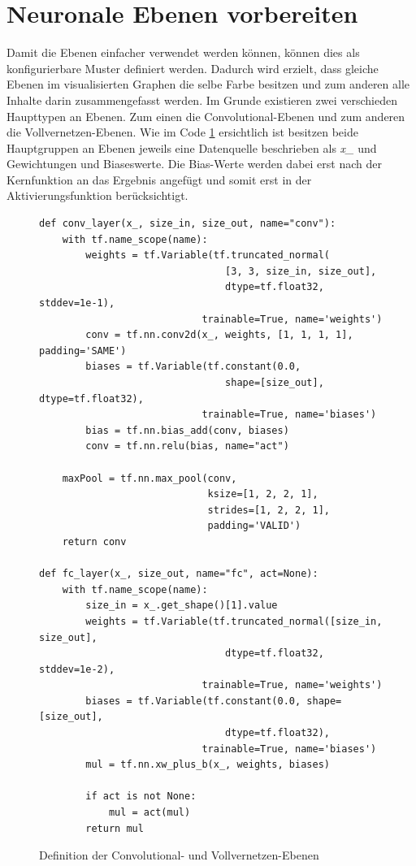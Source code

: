 \section{Neuronale Ebenen vorbereiten}

Damit die Ebenen einfacher verwendet werden können, können dies als konfigurierbare Muster definiert werden. 
Dadurch wird erzielt, dass gleiche Ebenen im visualisierten Graphen die selbe Farbe besitzen und zum anderen alle Inhalte darin zusammengefasst werden. 
Im Grunde existieren zwei verschieden Haupttypen an Ebenen. 
Zum einen die Convolutional-Ebenen und zum anderen die Vollvernetzen-Ebenen. 
Wie im Code \ref{fig:ConvFc} ersichtlich ist besitzen beide Hauptgruppen an Ebenen jeweils eine Datenquelle beschrieben als \textit{x\_} und Gewichtungen und Biaseswerte. 
Die Bias-Werte werden dabei erst nach der Kernfunktion an das Ergebnis angefügt und somit erst in der Aktivierungsfunktion berücksichtigt. 
\begin{figure}[ht!]
\lstset{language=Python}
\begin{lstlisting}
def conv_layer(x_, size_in, size_out, name="conv"):
    with tf.name_scope(name):
        weights = tf.Variable(tf.truncated_normal(
        						[3, 3, size_in, size_out], 
        						dtype=tf.float32, stddev=1e-1), 
							trainable=True, name='weights')
        conv = tf.nn.conv2d(x_, weights, [1, 1, 1, 1], padding='SAME')
        biases = tf.Variable(tf.constant(0.0, 
								shape=[size_out], dtype=tf.float32), 
                            trainable=True, name='biases')
        bias = tf.nn.bias_add(conv, biases)
        conv = tf.nn.relu(bias, name="act")

    maxPool = tf.nn.max_pool(conv, 
                             ksize=[1, 2, 2, 1],
                             strides=[1, 2, 2, 1],
                             padding='VALID')
    return conv

def fc_layer(x_, size_out, name="fc", act=None):
    with tf.name_scope(name):
        size_in = x_.get_shape()[1].value
        weights = tf.Variable(tf.truncated_normal([size_in, size_out], 
								dtype=tf.float32, stddev=1e-2), 
							trainable=True, name='weights')
        biases = tf.Variable(tf.constant(0.0, shape=[size_out], 
								dtype=tf.float32), 
							trainable=True, name='biases')
        mul = tf.nn.xw_plus_b(x_, weights, biases)
        
        if act is not None:
            mul = act(mul)
        return mul
\end{lstlisting}
	\caption{Definition der Convolutional- und Vollvernetzen-Ebenen}
	\label{fig:ConvFc}
\end{figure}

